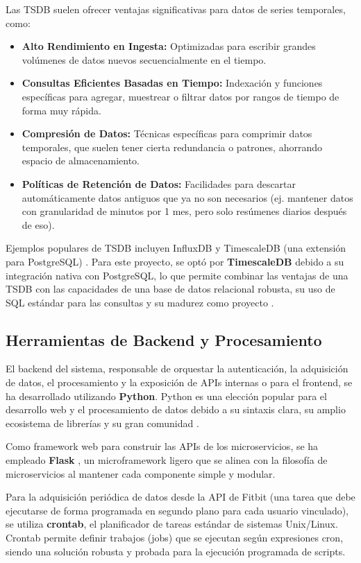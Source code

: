 Las TSDB suelen ofrecer ventajas significativas para datos de series temporales, como:
\begin{itemize}
    \item \textbf{Alto Rendimiento en Ingesta:} Optimizadas para escribir grandes volúmenes de datos nuevos secuencialmente en el tiempo.
    \item \textbf{Consultas Eficientes Basadas en Tiempo:} Indexación y funciones específicas para agregar, muestrear o filtrar datos por rangos de tiempo de forma muy rápida.
    \item \textbf{Compresión de Datos:} Técnicas específicas para comprimir datos temporales, que suelen tener cierta redundancia o patrones, ahorrando espacio de almacenamiento.
    \item \textbf{Políticas de Retención de Datos:} Facilidades para descartar automáticamente datos antiguos que ya no son necesarios (ej. mantener datos con granularidad de minutos por 1 mes, pero solo resúmenes diarios después de eso).
\end{itemize}
Ejemplos populares de TSDB incluyen InfluxDB y TimescaleDB (una extensión para PostgreSQL) \cite{influxdb_docs, timescaledb_docs}. Para este proyecto, se optó por \textbf{TimescaleDB} debido a su integración nativa con PostgreSQL, lo que permite combinar las ventajas de una TSDB con las capacidades de una base de datos relacional robusta, su uso de SQL estándar para las consultas y su madurez como proyecto \cite{timescaledb_docs}.

\subsection{Herramientas de Backend y Procesamiento}
\label{subsec:ea_backend_tools}

El backend del sistema, responsable de orquestar la autenticación, la adquisición de datos, el procesamiento y la exposición de APIs internas o para el frontend, se ha desarrollado utilizando \textbf{Python}. Python es una elección popular para el desarrollo web y el procesamiento de datos debido a su sintaxis clara, su amplio ecosistema de librerías y su gran comunidad \cite{python_website}.

Como framework web para construir las APIs de los microservicios, se ha empleado \textbf{Flask} \cite{flask_docs}, un microframework ligero que se alinea con la filosofía de microservicios al mantener cada componente simple y modular.

Para la adquisición periódica de datos desde la API de Fitbit\textsuperscript{\textregistered} (una tarea que debe ejecutarse de forma programada en segundo plano para cada usuario vinculado), se utiliza \textbf{crontab}, el planificador de tareas estándar de sistemas Unix/Linux. Crontab permite definir trabajos (jobs) que se ejecutan según expresiones cron, siendo una solución robusta y probada para la ejecución programada de scripts.

